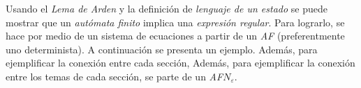 
Usando el \textit{Lema de Arden} y la definición de \textit{lenguaje de un estado} se puede mostrar que un \textit{autómata finito} implica una \textit{expresión regular}. Para lograrlo, se hace por medio de un sistema de ecuaciones a partir de un \textit{AF} (preferentmente uno determinista). A continuación se presenta un ejemplo. Además, para ejemplificar la conexión entre cada sección, Además, para ejemplificar la conexión entre los temas de cada sección, se parte de un \textit{AF$N_\varepsilon$}.

